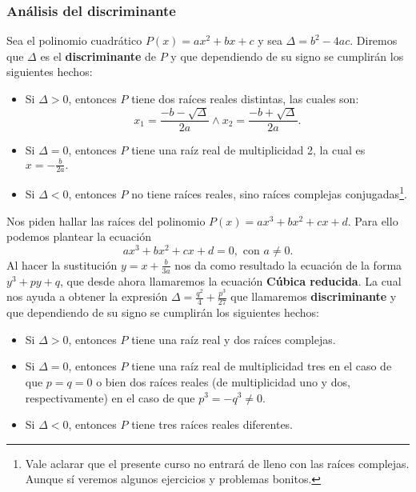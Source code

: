 {    \subsubsection{Análisis del discriminante}
    {
        Sea el polinomio cuadrático $P(x) = ax^2 + bx + c$ y sea $\Delta = b^2 - 4ac$.
        Diremos que $\Delta$ es el \textbf{discriminante} de $P$ y que dependiendo de su signo se cumplirán los siguientes hechos:
        \begin{itemize}
            \item Si $\Delta > 0$, entonces $P$ tiene dos raíces reales distintas, las cuales son:
            \[x_1 = \frac{-b - \sqrt{\Delta}}{2a} \land x_2 = \frac{-b + \sqrt {\Delta}}{2a}.\]
            \item Si $\Delta = 0$, entonces $P$ tiene una raíz real de multiplicidad 2, la cual es $x = -\frac{b}{2a}.$
            \item Si $\Delta < 0$, entonces $P$ no tiene raíces reales, sino raíces complejas conjugadas\footnote{Vale aclarar que el presente curso no entrará de lleno con las raíces complejas.\\Aunque sí veremos algunos ejercicios y problemas bonitos.}.
        \end{itemize}

        Nos piden hallar las raíces del polinomio $P(x) = ax^3 + bx^2 + cx + d$. Para ello podemos plantear la ecuación
        \[ ax^3 + bx^2 + cx + d = 0, \mbox{ con } a \neq 0. \]
        Al hacer la sustitución $y = x + \frac{b}{3a}$ nos da como resultado la ecuación de la forma $y^3 + py + q$, que desde ahora llamaremos la ecuación \textbf{Cúbica reducida}.
        La cual nos ayuda a obtener la expresión $\Delta = \frac{q^2}{4} + \frac{p^3}{27}$ que llamaremos \textbf{discriminante} y que dependiendo de su signo se cumplirán los siguientes hechos:
        \begin{itemize}
            \item Si $\Delta > 0$, entonces $P$ tiene una raíz real y dos raíces complejas.
            \item Si $\Delta = 0$, entonces $P$ tiene una raíz real de multiplicidad tres en el caso de que $p = q = 0$ o bien dos raíces reales (de multiplicidad uno y dos, respectivamente) en el caso de que $p^3 = -q^3 \neq 0.$
            \item Si $\Delta < 0$, entonces $P$ tiene tres raíces reales diferentes.
        \end{itemize}
    }

}
